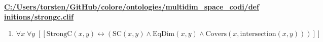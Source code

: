 \documentclass{article}
\begin{document}
\textbf{\url{C:/Users/torsten/GitHub/colore/ontologies/multidim\_space\_codi/definitions/strongc.clif}}

\begin{enumerate}
\item $\forall x\; \forall y\;  \left[ \left[ \textrm{StrongC}(x,y) \leftrightarrow \left(\textrm{SC}(x,y) \land \textrm{EqDim}(x,y) \land \textrm{Covers}(x,\textrm{intersection}(x,y))\right) \right] \right]$
\end{enumerate}
\end{document}
